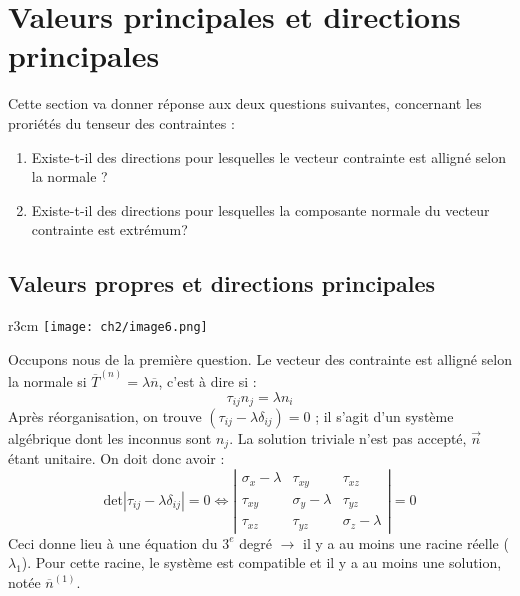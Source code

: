 \section{Valeurs principales et directions principales}
Cette section va donner réponse aux deux questions suivantes, concernant les proriétés du tenseur des
contraintes : 
\begin{enumerate}
\item Existe-t-il des directions pour lesquelles le vecteur contrainte est alligné selon la normale ?
\item Existe-t-il des directions pour lesquelles la composante normale du vecteur contrainte est extrémum?
\end{enumerate}

    \subsection{Valeurs propres et directions principales}
    \begin{wrapfigure}[11]{r}{3cm}
    \texttt{[image: ch2/image6.png]}
    \end{wrapfigure}
    Occupons nous de la première question. Le vecteur des contrainte est alligné selon la normale si 
    $\overline{T}^{(n)} = \lambda \overline{n}$, c'est à dire si :
    \begin{equation}
    \tau_{ij}n_j = \lambda n_i
    \end{equation}
    Après réorganisation, on trouve $(\tau_{ij} - \lambda \delta_{ij}) = 0$ ; il s'agit d'un système
    algébrique dont les inconnus sont $n_j$. La solution triviale n'est pas accepté, $\vec{n}$ étant 
    unitaire. On doit donc avoir : 
    \begin{equation}
    \text{det}|\tau_{ij} - \lambda \delta_{ij}|=0 \Leftrightarrow \left|\begin{array}{ccc}
    \sigma_x - \lambda      &\tau_{xy}              &\tau_{xz}\\
    \tau_{xy}               &\sigma_y-\lambda       &\tau_{yz}\\
    \tau_{xz}               &\tau_{yz}              &\sigma_z - \lambda
    \end{array}\right| = 0
    \end{equation}
    Ceci donne lieu à une équation du $3^e$ degré $\rightarrow$ il y a au moins une racine réelle ($\lambda_1$). 
    Pour cette racine, le système est compatible et il y a au moins une solution, notée $\overline{n}^{(1)}$.
